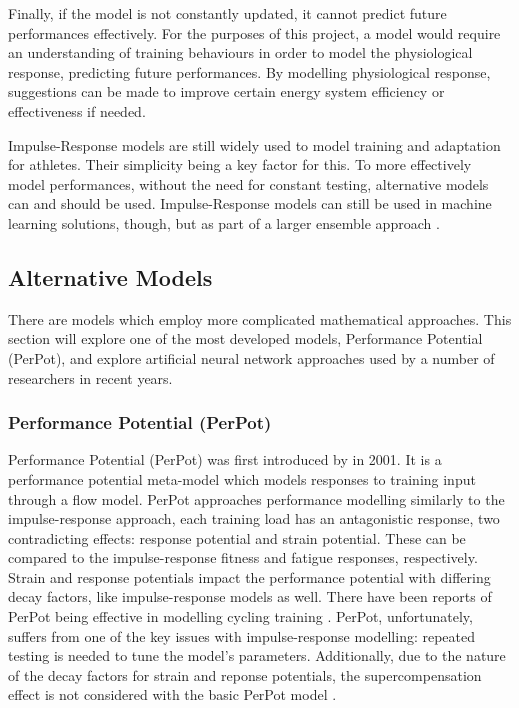 Finally, if the model is not constantly updated, it cannot predict future performances effectively. For the purposes of this project, a model would require an understanding of training behaviours in order to model the physiological response, predicting future performances. By modelling physiological response, suggestions can be made to improve certain energy system efficiency or effectiveness if needed. 

Impulse-Response models are still widely used to model training and adaptation for athletes. Their simplicity being a key factor for this. To more effectively model performances, without the need for constant testing, alternative models can and should be used. Impulse-Response models can still be used in machine learning solutions, though, but as part of a larger ensemble approach \cite{Imbach2022}.

\subsection{Alternative Models}
There are models which employ more complicated mathematical approaches. This section will explore one of the most developed models, Performance Potential (PerPot), and explore artificial neural network approaches used by a number of researchers in recent years.

\subsubsection{Performance Potential (PerPot)}
Performance Potential (PerPot) was first introduced by \textcite{perl2001} in 2001. It is a performance potential meta-model which models responses to training input through a flow model. PerPot approaches performance modelling similarly to the impulse-response approach, each training load has an antagonistic response, two contradicting effects: response potential and strain potential. These can be compared to the impulse-response fitness and fatigue responses, respectively. Strain and response potentials impact the performance potential with differing decay factors, like impulse-response models as well. There have been reports of PerPot being effective in modelling cycling training \cite{Churchill2014}. PerPot, unfortunately, suffers from one of the key issues with impulse-response modelling: repeated testing is needed to tune the model's parameters. Additionally, due to the nature of the decay factors for strain and reponse potentials, the supercompensation effect is not considered with the basic PerPot model \cite{Churchill2014}. 

